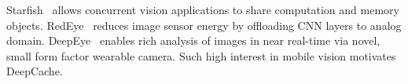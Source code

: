 \documentclass[10pt,acmtog]{acmart}
\newcommand{\framework}{DeepCache\xspace}
\newcommand{\sys}{\framework{}}
\begin{document}
Starfish~\cite{conf/mobisys/LiKamWaZ15} allows concurrent vision applications to share computation and memory objects.
RedEye~\cite{conf/isca/LiKamWaHGPZ16} reduces image sensor energy by offloading CNN layers to analog domain. %
DeepEye~\cite{conf/mobisys/MathurLBBFK17} enables rich analysis of images in near real-time via novel, small form factor wearable camera. 
Such high interest in mobile vision motivates \sys{}. 
\end{document}
